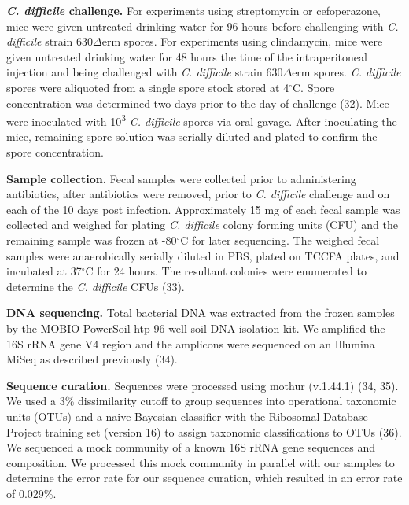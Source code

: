 \documentclass[
  12pt,
]{article}
\begin{document}
\textbf{\emph{C. difficile} challenge.} For experiments using
streptomycin or cefoperazone, mice were given untreated drinking water
for 96 hours before challenging with \emph{C. difficile} strain
630\(\Delta\)erm spores. For experiments using clindamycin, mice were
given untreated drinking water for 48 hours the time of the
intraperitoneal injection and being challenged with \emph{C. difficile}
strain 630\(\Delta\)erm spores. \emph{C. difficile} spores were
aliquoted from a single spore stock stored at 4\(^\circ\)C. Spore
concentration was determined two days prior to the day of challenge
(32). Mice were inoculated with 10\textsuperscript{3} \emph{C.
difficile} spores via oral gavage. After inoculating the mice, remaining
spore solution was serially diluted and plated to confirm the spore
concentration.

\textbf{Sample collection.} Fecal samples were collected prior to
administering antibiotics, after antibiotics were removed, prior to
\emph{C. difficile} challenge and on each of the 10 days post infection.
Approximately 15 mg of each fecal sample was collected and weighed for
plating \emph{C. difficile} colony forming units (CFU) and the remaining
sample was frozen at -80\(^\circ\)C for later sequencing. The weighed
fecal samples were anaerobically serially diluted in PBS, plated on
TCCFA plates, and incubated at 37\(^\circ\)C for 24 hours. The resultant
colonies were enumerated to determine the \emph{C. difficile} CFUs (33).

\textbf{DNA sequencing.} Total bacterial DNA was extracted from the
frozen samples by the MOBIO PowerSoil-htp 96-well soil DNA isolation
kit. We amplified the 16S rRNA gene V4 region and the amplicons were
sequenced on an Illumina MiSeq as described previously (34).

\textbf{Sequence curation.} Sequences were processed using mothur
(v.1.44.1) (34, 35). We used a 3\% dissimilarity cutoff to group
sequences into operational taxonomic units (OTUs) and a naive Bayesian
classifier with the Ribosomal Database Project training set (version 16)
to assign taxonomic classifications to OTUs (36). We sequenced a mock
community of a known 16S rRNA gene sequences and composition. We
processed this mock community in parallel with our samples to determine
the error rate for our sequence curation, which resulted in an error
rate of 0.029\%.
\end{document}
